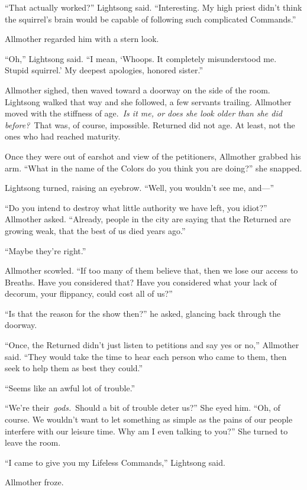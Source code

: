 “That actually worked?” Lightsong said. “Interesting. My high priest didn’t think the squirrel’s brain would be capable of following such complicated Commands.”

Allmother regarded him with a stern look.

“Oh,” Lightsong said. “I mean, ‘Whoops. It completely misunderstood me. Stupid squirrel.’ My deepest apologies, honored sister.”

Allmother sighed, then waved toward a doorway on the side of the room. Lightsong walked that way and she followed, a few servants trailing. Allmother moved with the stiffness of age.~\textit{Is it me, or does she look older than she did before?}~That was, of course, impossible. Returned did not age. At least, not the ones who had reached maturity.

Once they were out of earshot and view of the petitioners, Allmother grabbed his arm. “What in the name of the Colors do you think you are doing?” she snapped.

Lightsong turned, raising an eyebrow. “Well, you wouldn’t see me, and—”

“Do you intend to destroy what little authority we have left, you idiot?” Allmother asked. “Already, people in the city are saying that the Returned are growing weak, that the best of us died years ago.”

“Maybe they’re right.”

Allmother scowled. “If too many of them believe that, then we lose our access to Breaths. Have you considered that? Have you considered what your lack of decorum, your flippancy, could cost all of us?”

“Is that the reason for the show then?” he asked, glancing back through the doorway.

“Once, the Returned didn’t just listen to petitions and say yes or no,” Allmother said. “They would take the time to hear each person who came to them, then seek to help them as best they could.”

“Seems like an awful lot of trouble.”

“We’re their~\textit{gods.}~Should a bit of trouble deter us?” She eyed him. “Oh, of course. We wouldn’t want to let something as simple as the pains of our people interfere with our leisure time. Why am I even talking to you?” She turned to leave the room.

“I came to give you my Lifeless Commands,” Lightsong said.

Allmother froze.

